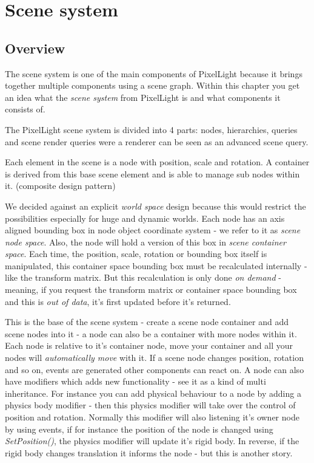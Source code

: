 \chapter{Scene system}




\section{Overview}
The scene system is one of the main components of PixelLight because it brings together multiple components using a scene graph. Within this chapter you get an idea what the \emph{scene system} from PixelLight is and what components it consists of.

The PixelLight scene system is divided into 4 parts: nodes, hierarchies, queries and scene render queries were a renderer can be seen as an advanced scene query.

Each element in the scene is a node with position, scale and rotation. A container is derived from this base scene element and is able to manage sub nodes within it. (composite design pattern)

We decided against an explicit \emph{world space} design because this would restrict the possibilities especially for huge and dynamic worlds. Each node has an axis aligned bounding box in node object coordinate system - we refer to it as \emph{scene node space}. Also, the node will hold a version of this box in \emph{scene container space}. Each time, the position, scale, rotation or bounding box itself is manipulated, this container space bounding box must be recalculated internally - like the transform matrix. But this recalculation is only done \emph{on demand} - meaning, if you request the transform matrix or container space bounding box and this is \emph{out of data}, it's first updated before it's returned.

This is the base of the scene system - create a scene node container and add scene nodes into it - a node can also be a container with more nodes within it. Each node is relative to it's container node, move your container and all your nodes will \emph{automatically move} with it. If a scene node changes position, rotation and so on, events are generated other components can react on. A node can also have modifiers which adds new functionality - see it as a kind of multi inheritance. For instance you can add physical behaviour to a node by adding a physics body modifier - then this physics modifier will take over the control of position and rotation. Normally this modifier will also listening it's owner node by using events, if for instance the position of the node is changed using \emph{SetPosition()}, the physics modifier will update it's rigid body. In reverse, if the rigid body changes translation it informs the node - but this is another story.


